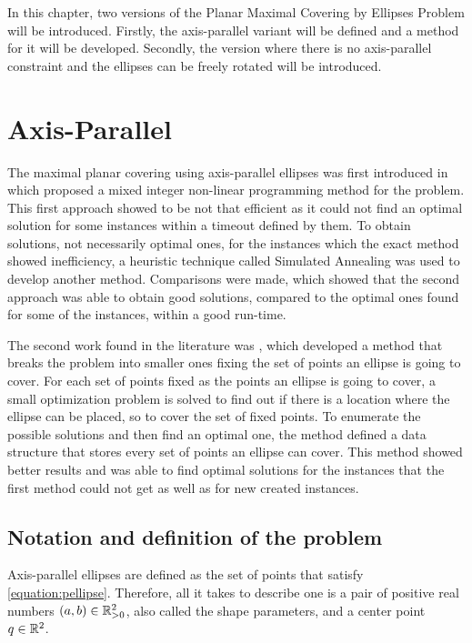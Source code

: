 In this chapter, two versions of the Planar Maximal Covering by Ellipses Problem will be introduced.
Firstly, the axis-parallel variant will be defined and a method for it will be developed. Secondly, the version where there is no axis-parallel constraint and the ellipses can be freely rotated will be introduced.

\section{Axis-Parallel}
The maximal planar covering using axis-parallel ellipses was first introduced in \cite{canbolat} which proposed a mixed integer non-linear programming method for the problem. This first approach showed to be not that efficient as it could not find an optimal solution for some instances within a timeout defined by them. To obtain solutions, not necessarily optimal ones, for the instances which the exact method showed inefficiency, a heuristic technique called Simulated Annealing was used to develop another method. Comparisons were made, which showed that the second approach was able to obtain good solutions, compared to the optimal ones found for some of the instances, within a good run-time.

The second work found in the literature was \cite{andreta}, which developed a method that breaks the problem into smaller ones fixing the set of points an ellipse is going to cover. For each set of points fixed as the points an ellipse is going to cover, a small optimization problem is solved to find out if there is a location where the ellipse can be placed, so to cover the set of fixed points. To enumerate the possible solutions and then find an optimal one, the method defined a data structure that stores every set of points an ellipse can cover. This method showed better results and was able to find optimal solutions for the instances that the first method could not get as well as for new created instances.

\subsection{Notation and definition of the problem}

Axis-parallel ellipses are defined as the set of points that satisfy \autoref{equation:pellipse}. Therefore, all it takes to describe one is a pair of positive real numbers $(a,b) \in \mathbb{R}_{>0}^2$, also called the shape parameters, and a center point $q \in \mathbb{R}^2$. 

